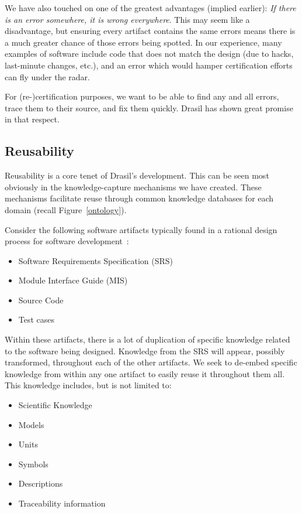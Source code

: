 \documentclass[sigconf]{acmart}
\begin{document}
We have also touched on one of the greatest advantages (implied 
earlier): \emph{If there is an error somewhere, it is wrong everywhere}. This 
may seem like a disadvantage, but ensuring every artifact contains the same 
errors means there is a much greater chance of those errors being spotted. In 
our experience, many examples of software include code that does not match the 
design (due to hacks, last-minute changes, etc.), and an error which would 
hamper certification efforts can fly under the radar. 

For (re-)certification purposes, we want to be able to find any and all errors, 
trace them to their source, and fix them quickly. Drasil has shown great 
promise in that respect.

\subsection{Reusability}

Reusability is a core tenet of Drasil's development. This can be seen 
most obviously in the knowledge-capture mechanisms we have created. These 
mechanisms facilitate reuse through common knowledge databases for each domain 
(recall Figure~\ref{ontology}).

Consider the following software artifacts typically found in a rational design 
process for software development~\cite{ParnasAndClements1986}:

\begin{itemize}
\item Software Requirements Specification (SRS)
\item Module Interface Guide (MIS)
\item Source Code
\item Test cases
\end{itemize}

Within these artifacts, there is a lot of duplication of specific knowledge 
related to the software being designed. Knowledge from the SRS will appear, 
possibly transformed, throughout each of the other artifacts. We seek to 
de-embed specific knowledge from within any one artifact to easily reuse 
it throughout them all. This knowledge includes, but is not limited to:

\begin{itemize}
\item Scientific Knowledge
\item Models
\item Units
\item Symbols
\item Descriptions
\item Traceability information
\end{itemize}
\end{document}
